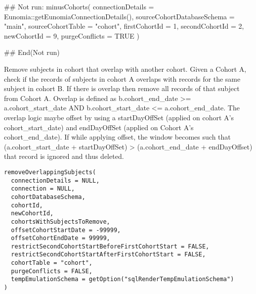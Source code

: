 \documentclass[a4paper]{book}
\begin{document}
%
\begin{Examples}
\begin{ExampleCode}
## Not run: 
minusCohorts(
  connectionDetails = Eunomia::getEunomiaConnectionDetails(),
  sourceCohortDatabaseSchema = "main",
  sourceCohortTable = "cohort",
  firstCohortId = 1,
  secondCohortId = 2,
  newCohortId = 9,
  purgeConflicts = TRUE
)

## End(Not run)

\end{ExampleCode}
\end{Examples}
%
\begin{Description}\relax
Remove subjects in cohort that overlap with another cohort. Given a Cohort A, check if the records of
subjects in cohort A overlaps with records for the same subject in cohort B. If there is overlap
then remove all records of that subject from Cohort A.
Overlap is defined as b.cohort\_end\_date >= a.cohort\_start\_date AND b.cohort\_start\_date <= a.cohort\_end\_date.
The overlap logic maybe offset by using a startDayOffSet (applied on cohort A's cohort\_start\_date)
and endDayOffSet (applied on Cohort A's cohort\_end\_date). If while applying offset, the window becomes
such that (a.cohort\_start\_date + startDayOffSet) > (a.cohort\_end\_date + endDayOffset) that record is ignored
and thus deleted.

\strong{[Experimental]}
\end{Description}
%
\begin{Usage}
\begin{verbatim}
removeOverlappingSubjects(
  connectionDetails = NULL,
  connection = NULL,
  cohortDatabaseSchema,
  cohortId,
  newCohortId,
  cohortsWithSubjectsToRemove,
  offsetCohortStartDate = -99999,
  offsetCohortEndDate = 99999,
  restrictSecondCohortStartBeforeFirstCohortStart = FALSE,
  restrictSecondCohortStartAfterFirstCohortStart = FALSE,
  cohortTable = "cohort",
  purgeConflicts = FALSE,
  tempEmulationSchema = getOption("sqlRenderTempEmulationSchema")
)
\end{verbatim}
\end{Usage}
%
\end{document}
